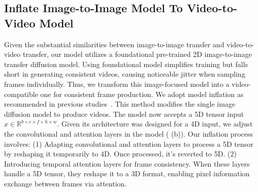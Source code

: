 \subsection{Inflate Image-to-Image Model To Video-to-Video Model}
Given the substantial similarities between image-to-image transfer and video-to-video transfer, our model utilizes a foundational pre-trained 2D image-to-image transfer diffusion model. Using foundational model simplifies training but falls short in generating consistent videos, causing noticeable jitter when sampling frames individually. Thus, we transform this image-focused model into a video-compatible one for consistent frame production. We adopt model inflation as recommended in previous studies~\cite{tuneavideo,guo2023animatediff}. This method modifies the single image diffusion model to produce videos. The model now accepts a 5D tensor input $x \in \mathbb{R}^{b \times c \times f \times h \times w}$. Given its architecture was designed for a 4D input, we adjust the convolutional and attention layers in the model ( (b)). Our inflation process involves: (1) Adapting convolutional and attention layers to process a 5D tensor by reshaping it temporarily to 4D. Once processed, it's reverted to 5D. (2) Introducing temporal attention layers for frame consistency. When these layers handle a 5D tensor, they reshape it to a 3D format, enabling pixel information exchange between frames via attention.


